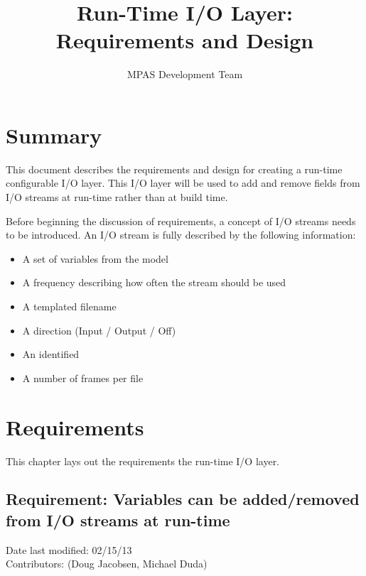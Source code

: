 \documentclass[11pt]{report}
\begin{document}
\title{Run-Time I/O Layer: \\
Requirements and Design}
\author{MPAS Development Team}

\maketitle
\tableofcontents


\chapter{Summary}

This document describes the requirements and design for creating a run-time
configurable I/O layer.  This I/O layer will be used to add and remove fields
from I/O streams at run-time rather than at build time. 

Before beginning the discussion of requirements, a concept of I/O streams needs
to be introduced. An I/O stream is fully described by the following information:

\begin{itemize}
	\item A set of variables from the model
	\item A frequency describing how often the stream should be used
	\item A templated filename
	\item A direction (Input / Output / Off)
	\item An identified
	\item A number of frames per file
\end{itemize}


\chapter{Requirements}

This chapter lays out the requirements the run-time I/O layer.
\section{Requirement: Variables can be added/removed from I/O streams at run-time}
Date last modified: 02/15/13 \\
Contributors: (Doug Jacobsen, Michael Duda) \\
\end{document}
